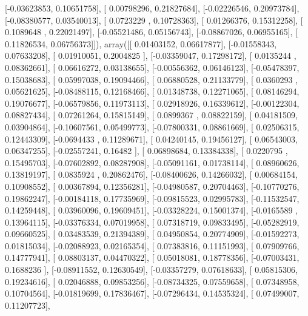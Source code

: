 \documentclass{article}
\begin{document}
       [-0.03623853,  0.10651758],
       [ 0.00798296,  0.21827684],
       [-0.02226546,  0.20973784],
       [-0.08380577,  0.03540013],
       [ 0.0723229 ,  0.10728363],
       [ 0.01266376,  0.15312258],
       [ 0.1089648 ,  0.22021497],
       [-0.05521486,  0.05156743],
       [-0.08867026,  0.06955165],
       [ 0.11826534,  0.06756373]]), array([[ 0.01403152,  0.06617877],
       [-0.01558343,  0.07633208],
       [ 0.01910051,  0.2004825 ],
       [-0.03359047,  0.17298172],
       [ 0.0135244 ,  0.08362661],
       [ 0.06616272,  0.03138655],
       [-0.00556362,  0.06146123],
       [-0.05478397,  0.15038683],
       [ 0.05997038,  0.19094466],
       [ 0.06880528,  0.21133779],
       [ 0.0360293 ,  0.05621625],
       [-0.08488115,  0.12168466],
       [ 0.01348738,  0.12271065],
       [ 0.08146294,  0.19076677],
       [-0.06579856,  0.11973113],
       [ 0.02918926,  0.16339612],
       [-0.00122304,  0.08827434],
       [ 0.07261264,  0.15815149],
       [ 0.0899367 ,  0.08822159],
       [ 0.04181509,  0.03904864],
       [-0.10607561,  0.05499773],
       [-0.07800331,  0.08861669],
       [ 0.02506315,  0.12443309],
       [-0.0694433 ,  0.11289671],
       [ 0.04240145,  0.19456127],
       [ 0.06543003,  0.06347255],
       [-0.02557241,  0.16482   ],
       [ 0.06898684,  0.13384338],
       [ 0.0220795 ,  0.15495703],
       [-0.07602892,  0.08287908],
       [-0.05091161,  0.01738114],
       [ 0.08960626,  0.13819197],
       [ 0.0835924 ,  0.20862476],
       [-0.08400626,  0.14266032],
       [ 0.00684154,  0.10908552],
       [ 0.00367894,  0.12356281],
       [-0.04980587,  0.20704463],
       [-0.10770276,  0.19862247],
       [-0.00184118,  0.17735969],
       [-0.09815523,  0.02995783],
       [-0.11532547,  0.14259448],
       [ 0.03960096,  0.19609451],
       [-0.03328224,  0.15001374],
       [-0.0165589 ,  0.13964115],
       [-0.03376334,  0.07019958],
       [ 0.07318719,  0.09833495],
       [-0.05282919,  0.09660525],
       [ 0.03483539,  0.21394389],
       [ 0.04950854,  0.20774909],
       [-0.01592273,  0.01815034],
       [-0.02088923,  0.02165354],
       [ 0.07383816,  0.11151993],
       [ 0.07909766,  0.14777941],
       [ 0.08803137,  0.04470322],
       [ 0.05018081,  0.18778356],
       [-0.07003431,  0.1688236 ],
       [-0.08911552,  0.12630549],
       [-0.03357279,  0.07618633],
       [ 0.05815306,  0.19234616],
       [ 0.02046888,  0.09853256],
       [-0.08734325,  0.07559658],
       [ 0.07348958,  0.10704564],
       [-0.01819699,  0.17836467],
       [-0.07296434,  0.14535324],
       [ 0.07499007,  0.11207723],
\end{document}
